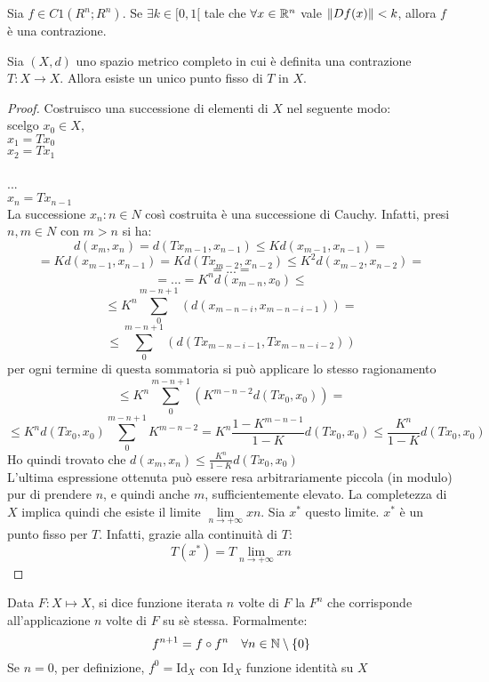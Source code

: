 \proposition
Sia $f \in C1(R^n;R^n)$. Se $\exists k \in [0, 1[$ tale che $\forall x \in \mathbb{R}^n$ vale $\left\|Df(x)\right\|  < k$, allora $f$ è una contrazione.

\begin{theorem}
	\label{teo:contrazioni}
	Sia $(X, d)$ uno spazio metrico completo in cui è definita una contrazione
	$T: X \rightarrow X$. Allora esiste un unico punto fisso di $T$ in $X$.
	\begin{proof}
		Costruisco una successione di elementi di $X$ nel seguente modo:\\
		scelgo $x_0\in X$,\\
		$x_1 = Tx_0$\\
		$x_2 = Tx_1$\\\\
		...\\
		$x_n = Tx_{n-1}$\\
		La successione ${x_n: n \in N }$ così costruita è una successione di Cauchy. Infatti, presi $n, m \in N$ con $m > n$ si ha:
		$$d(x_{m},x_{n}) = d(Tx_{m-1},x_{n-1}) \le Kd(x_{m-1},x_{n-1})=$$
		$$=Kd(x_{m-1},x_{n-1}) = Kd(Tx_{m-2},x_{n-2}) \le K^2d(x_{m-2},x_{n-2})=$$
		$$=...=$$
		$$=...=K^nd(x_{m-n},x_{0})\le$$
		$$\le K^{n}\sum\limits_0^{m-n+1}(d(x_{m-n-i},x_{m-n-i-1}))=$$
		$$\le \sum\limits_0^{m-n+1}(d(Tx_{m-n-i-1},Tx_{m-n-i-2}))$$
		per ogni termine di questa sommatoria si può applicare lo stesso ragionamento
		$$\le K^{n}\sum\limits_0^{m-n+1}(K^{m-n-2}d(Tx_{0},x_{0}))=$$
		$$\le K^{n}d(Tx_{0},x_{0})\sum\limits_0^{m-n+1}K^{m-n-2}=K^n\frac{1-K^{m-n-1}}{1-K}d(Tx_{0},x_{0}) \le \frac{K^n}{1-K}d(Tx_{0},x_{0})$$
		Ho quindi trovato che $d(x_{m},x_{n})\le\frac{K^n}{1-K}d(Tx_{0},x_{0})$\\
		L’ultima espressione ottenuta può essere resa arbitrariamente piccola (in modulo) pur di
		prendere $n$, e quindi anche $m$, sufficientemente elevato. La completezza di $X$ implica quindi
		che esiste il limite $\lim\limits_{n\rightarrow +\infty}xn$. Sia $x^*$ questo limite. $x^*$ è un punto fisso per $T$. Infatti, grazie
		alla continuità di $T$:
		$$T(x^*)=T{\lim\limits_{n\rightarrow +\infty}xn}$$
	\end{proof}
\end{theorem}

\begin{definition}
	\label{def:iterata}
	Data $F:X\mapsto X$, si dice funzione iterata $n$ volte di $F$ la $F^n$ che corrisponde all'applicazione $n$ volte di $F$ su sè stessa. Formalmente:
	$$f^{n+1} = f \circ f^n \quad \forall n \in \mathbb{N}\setminus\left\{0\right\}$$
	Se $n = 0$, per definizione, $f^0 = \mathrm{Id}_X$ con $\mathrm{Id}_X$ funzione identità su $X$
\end{definition}

